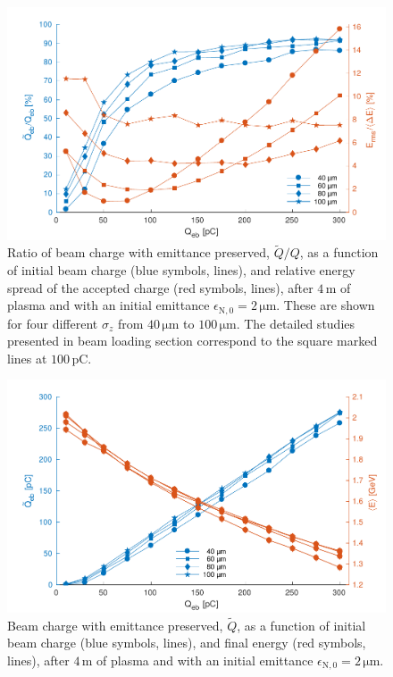 \documentclass[aps,prstab,reprint,amsmath,amssymb,groupedaddress]{revtex4-1}
\newcommand{\unit}[1]{\,\mathrm{#1}}
\begin{document}
\begin{figure}[hbt]
    \includegraphics[width=\linewidth,trim={2mm 0mm 2mm 0mm},clip]{figures/beamQuality}
    \caption{\label{Fig:BeamQ} Ratio of beam charge with emittance preserved, $\widetilde{Q}/Q$, as a function of
        initial beam charge (blue symbols, lines), and relative energy spread of the accepted charge (red symbols,
        lines), after $4\unit{m}$ of plasma and with an initial emittance $\epsilon_{\mathrm{N},0}=2\unit{\mu m}$.
        These are shown for four different $\sigma_{z}$ from $40\unit{\mu m}$ to $100\unit{\mu m}$. The detailed studies
        presented in beam loading section correspond to the square marked lines at $100\unit{pC}$.}
\end{figure}

\begin{figure}[hbt]
    \includegraphics[width=\linewidth,trim={2mm 0mm 2mm 0mm},clip]{figures/beamQualityAbs}
    \caption{\label{Fig:BeamQAbs} Beam charge with emittance preserved, $\widetilde{Q}$, as a function of initial beam
        charge (blue symbols, lines), and final energy (red symbols, lines), after $4\unit{m}$ of plasma and with an
        initial emittance $\epsilon_{\mathrm{N},0}=2\unit{\mu m}$.}
\end{figure}
\end{document}
